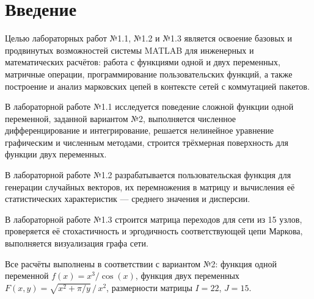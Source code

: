 \chapter*{Введение}
\label{ch:intro}

    Целью лабораторных работ №1.1, №1.2 и №1.3 является освоение базовых и продвинутых возможностей системы MATLAB для инженерных и математических расчётов: работа с функциями одной и двух переменных, матричные операции, программирование пользовательских функций, а также построение и анализ марковских цепей в контексте сетей с коммутацией пакетов.

    В лабораторной работе №1.1 исследуется поведение сложной функции одной переменной, заданной вариантом №2, выполняется численное дифференцирование и интегрирование, решается нелинейное уравнение графическим и численным методами, строится трёхмерная поверхность для функции двух переменных.

    В лабораторной работе №1.2 разрабатывается пользовательская функция для генерации случайных векторов, их перемножения в матрицу и вычисления её статистических характеристик — среднего значения и дисперсии.

    В лабораторной работе №1.3 строится матрица переходов для сети из 15 узлов, проверяется её стохастичность и эргодичность соответствующей цепи Маркова, выполняется визуализация графа сети.

    Все расчёты выполнены в соответствии с вариантом №2: функция одной переменной $f(x) = x^3 / \cos(x)$, функция двух переменных $F(x,y) = \sqrt{x^2 + \pi/y} \,/\, x^2$, размерности матрицы $I = 22$, $J = 15$.

\endinput